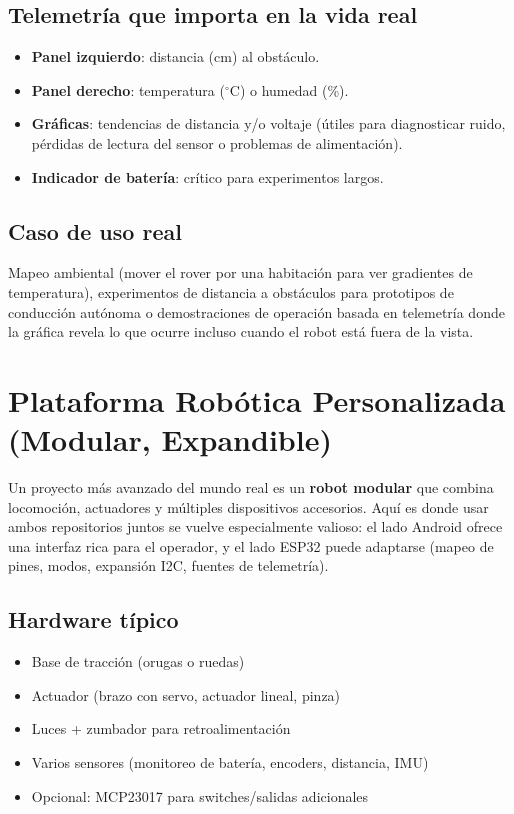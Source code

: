\subsection*{Telemetría que importa en la vida real}
\begin{itemize}
    \item \textbf{Panel izquierdo}: distancia (cm) al obstáculo.
    \item \textbf{Panel derecho}: temperatura (\(^\circ\)C) o humedad (\%).
    \item \textbf{Gráficas}: tendencias de distancia y/o voltaje (útiles para diagnosticar ruido, pérdidas de lectura del sensor o problemas de alimentación).
    \item \textbf{Indicador de batería}: crítico para experimentos largos.
\end{itemize}

\subsection*{Caso de uso real}
Mapeo ambiental (mover el rover por una habitación para ver gradientes de temperatura), experimentos de distancia a obstáculos para prototipos de conducción autónoma o demostraciones de operación basada en telemetría donde la gráfica revela lo que ocurre incluso cuando el robot está fuera de la vista.

\section{Plataforma Robótica Personalizada (Modular, Expandible)}
\label{sec:example-custom-robot}

Un proyecto más avanzado del mundo real es un \textbf{robot modular} que combina locomoción, actuadores y múltiples dispositivos accesorios. Aquí es donde usar ambos repositorios juntos se vuelve especialmente valioso: el lado Android ofrece una interfaz rica para el operador, y el lado ESP32 puede adaptarse (mapeo de pines, modos, expansión I2C, fuentes de telemetría).

\subsection*{Hardware típico}
\begin{itemize}
    \item Base de tracción (orugas o ruedas)
    \item Actuador (brazo con servo, actuador lineal, pinza)
    \item Luces + zumbador para retroalimentación
    \item Varios sensores (monitoreo de batería, encoders, distancia, IMU)
    \item Opcional: MCP23017 para switches/salidas adicionales
\end{itemize}

